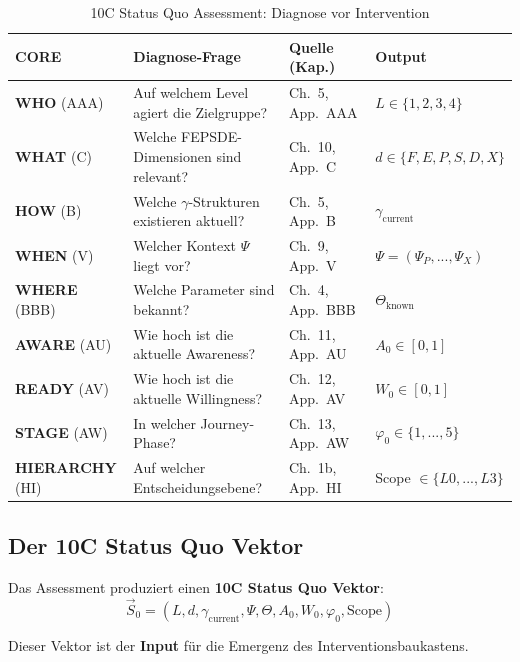 \begin{table}[htbp]
\centering
\caption{10C Status Quo Assessment: Diagnose vor Intervention}
\label{tab:17-9c-status-quo}
\renewcommand{\arraystretch}{1.4}
\footnotesize
\begin{tabular}{@{}llll@{}}
\toprule
\textbf{CORE} & \textbf{Diagnose-Frage} & \textbf{Quelle (Kap.)} & \textbf{Output} \\
\midrule
\textbf{WHO} (AAA) & Auf welchem Level agiert die Zielgruppe? & Ch.\ 5, App.\ AAA & $L \in \{1,2,3,4\}$ \\
\textbf{WHAT} (C) & Welche FEPSDE-Dimensionen sind relevant? & Ch.\ 10, App.\ C & $d \in \{F,E,P,S,D,X\}$ \\
\textbf{HOW} (B) & Welche $\gamma$-Strukturen existieren aktuell? & Ch.\ 5, App.\ B & $\gamma_{\text{current}}$ \\
\textbf{WHEN} (V) & Welcher Kontext $\Psi$ liegt vor? & Ch.\ 9, App.\ V & $\Psi = (\Psi_P, ..., \Psi_X)$ \\
\textbf{WHERE} (BBB) & Welche Parameter sind bekannt? & Ch.\ 4, App.\ BBB & $\Theta_{\text{known}}$ \\
\textbf{AWARE} (AU) & Wie hoch ist die aktuelle Awareness? & Ch.\ 11, App.\ AU & $A_0 \in [0,1]$ \\
\textbf{READY} (AV) & Wie hoch ist die aktuelle Willingness? & Ch.\ 12, App.\ AV & $W_0 \in [0,1]$ \\
\textbf{STAGE} (AW) & In welcher Journey-Phase? & Ch.\ 13, App.\ AW & $\varphi_0 \in \{1,...,5\}$ \\
\textbf{HIERARCHY} (HI) & Auf welcher Entscheidungsebene? & Ch.\ 1b, App.\ HI & Scope $\in \{L0,...,L3\}$ \\
\bottomrule
\end{tabular}
\end{table}

\subsection{Der 10C Status Quo Vektor}
\label{sec:17-vector}

Das Assessment produziert einen \textbf{10C Status Quo Vektor}:
\begin{equation}
\boxed{\vec{S}_0 = (L, d, \gamma_{\text{current}}, \Psi, \Theta, A_0, W_0, \varphi_0, \text{Scope})}
\label{eq:17-status-quo-vector}
\end{equation}

Dieser Vektor ist der \textbf{Input} f\"{u}r die Emergenz des Interventionsbaukastens.

